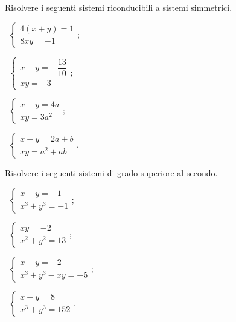 \begin{esercizio}[\Ast]
\label{ese:6.34}
Risolvere i seguenti sistemi riconducibili a sistemi simmetrici.
\begin{multicols}{2}
 \begin{enumeratea}
 \item~$\left\{\begin{array}{l}{4(x+y)=1}\\8xy=-1\end{array}\right.$;
 \item~$\left\{\begin{array}{l}x+y=-\dfrac{13}{10}\\xy=-3\end{array}\right.$;
 \item~$\left\{\begin{array}{l}x+y=4a\\xy=3a^{2}\end{array}\right.$;
 \item~$\left\{\begin{array}{l}x+y=2a+b\\xy=a^{2}+ab\end{array}\right.$.
 \end{enumeratea}
 \end{multicols}
\end{esercizio}

\begin{esercizio}[\Ast]
 \label{ese:6.35}
Risolvere i seguenti sistemi di grado superiore al secondo.
\begin{multicols}{2}
 \begin{enumeratea}
 \item~$\left\{\begin{array}{l}{x+y=-1}\\{x^3+y^3=-1}\end{array}\right.$;
 \item~$\left\{\begin{array}{l}{{xy}=-2}\\{x^2+y^2=13}\end{array}\right.$;
 \item~$\left\{\begin{array}{l}{x+y=-2}\\{x^3+y^3-{xy}=-5}\end{array}\right.$;
 \item~$\left\{\begin{array}{l}{x+y=8}\\{x^3+y^3=152}\end{array}\right.$.
 \end{enumeratea}
 \end{multicols}
\end{esercizio}


